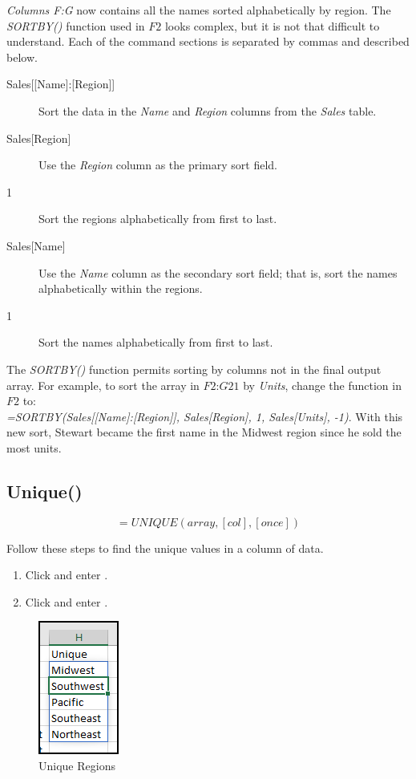\textit{Columns F:G} now contains all the names sorted alphabetically by region. The \textit{SORTBY()} function used in $ F2 $ looks complex, but it is not that difficult to understand. Each of the command sections is separated by commas and described below.

\begin{description}
	\item[{Sales[[Name]:[Region]]}] \textemdash\: Sort the data in the \textit{Name} and \textit{Region} columns from the \textit{Sales} table.
	\item[{Sales[Region]}] \textemdash\: Use the \textit{Region} column as the primary sort field.
	\item[1] \textemdash\: Sort the regions alphabetically from first to last.
	\item[{Sales[Name]}] Use the \textit{Name} column as the secondary sort field; that is, sort the names alphabetically within the regions.
	\item[1] \textemdash\: Sort the names alphabetically from first to last.	
\end{description}

The \textit{SORTBY()} function permits sorting by columns not in the final output array. For example, to sort the array in $ F2 $:$ G21 $ by \textit{Units}, change the function in $ F2 $ to:\\ \textit{=SORTBY(Sales[[Name]:[Region]], Sales[Region], 1, Sales[Units], -1)}. With this new sort, Stewart became the first name in the Midwest region since he sold the most units.

\subsection{Unique()}

\[ =UNIQUE(array,[col],[once]) \]

Follow these steps to find the unique values in a column of data.

\begin{enumbox}
	\begin{enumerate}
		\item Click  and enter .
		\item Click  and enter . 
	\end{enumerate}
\end{enumbox}

\begin{figure}[H]
	\centering
	\includegraphics{gfx/apb_fig03}
	\caption{Unique Regions}
	\label{apb:fig03}
\end{figure}

